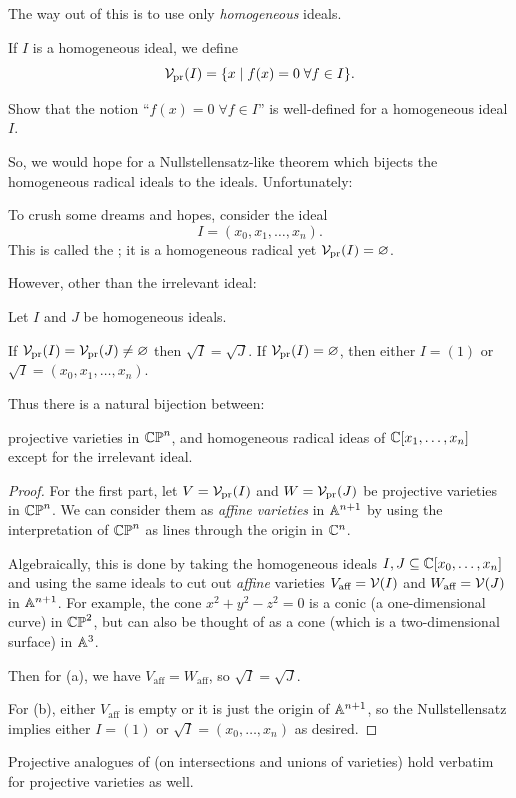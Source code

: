 The way out of this is to use only \emph{homogeneous} ideals.
\begin{definition}
	If $I$ is a homogeneous ideal, we define
	\[ \mathcal V_{\text{pr}}(I) = \{ x \mid f(x) = 0 \; \forall f \in I\}. \]
\end{definition}
\begin{exercise}
	Show that the notion ``$f(x) = 0 \; \forall f \in I$''
	is well-defined for a homogeneous ideal $I$.
\end{exercise}
So, we would hope for a Nullstellensatz-like theorem
which bijects the homogeneous radical ideals to the ideals.
Unfortunately:
\begin{example}
	To crush some dreams and hopes, consider the ideal
	\[ I = (x_0, x_1, \dots, x_n). \]
	This is called the ;
	it is a homogeneous radical yet $\mathcal V_{\text{pr}}(I) = \varnothing$.
\end{example}

However, other than the irrelevant ideal:
\begin{theorem}
	Let $I$ and $J$ be homogeneous ideals. 
	\begin{enumerate}[(a)]
		\ii If $\mathcal V_{\text{pr}}(I) = \mathcal V_{\text{pr}}(J) \neq \varnothing$ then $\sqrt I = \sqrt J$.
		\ii If $\mathcal V_{\text{pr}}(I) = \varnothing$, then either $I = (1)$
		or $\sqrt I = (x_0, x_1, \dots, x_n)$.
	\end{enumerate}
	Thus there is a natural bijection between:
	\begin{itemize}
		\ii projective varieties in $\mathbb{CP}^n$, and
		\ii homogeneous radical ideas of $\mathbb C[x_1, \dots, x_n]$ 
		except for the irrelevant ideal. 
	\end{itemize}
\end{theorem}
\begin{proof}
	For the first part, let $V = \mathcal V_{\text{pr}}(I)$ and $W = \mathcal V_{\text{pr}}(J)$
	be projective varieties in $\mathbb{CP}^n$.
	We can consider them as \emph{affine varieties} in $\mathbb A^{n+1}$
	by using the interpretation of $\mathbb{CP}^n$
	as lines through the origin in $\mathbb C^n$.

	Algebraically, this is done by taking the homogeneous ideals
	$I, J \subseteq \mathbb C[x_0, \dots, x_n]$
	and using the same ideals to cut out \emph{affine} varieties
	$V_{\text{aff}} = \mathcal V(I)$ and $W_{\text{aff}} = \mathcal V(J)$ in $\mathbb A^{n+1}$.
	For example, the cone $x^2+y^2-z^2=0$ is a conic (a one-dimensional curve)
	in $\mathbb{CP}^2$, but can also be thought of as a cone
	(which is a two-dimensional surface) in $\mathbb A^3$.

	Then for (a), we have $V_{\text{aff}} = W_{\text{aff}}$,
	so $\sqrt I = \sqrt J$.

	For (b), either $V_{\text{aff}}$ is empty 
	or it is just the origin of $\mathbb A^{n+1}$,
	so the Nullstellensatz implies either $I = (1)$
	or $\sqrt I = (x_0, \dots, x_n)$ as desired.
\end{proof}
Projective analogues of 
(on intersections and unions of varieties) hold verbatim
for projective varieties as well.


